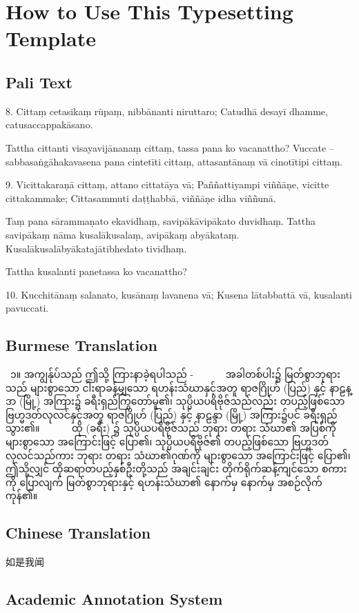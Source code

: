 \chapter{How to Use This Typesetting Template}

\starthere

\section{Pali Text}
8.
Cittaṃ cetasikaṃ rūpaṃ, nibbānanti niruttaro;
Catudhā desayī dhamme, catusaccappakāsano.

Tattha cittanti visayavijānanaṃ cittaṃ, tassa pana ko vacanattho? Vuccate – sabbasaṅgāhakavasena pana cintetīti cittaṃ, attasantānaṃ vā cinotītipi cittaṃ.

9.
Vicittakaraṇā cittaṃ, attano cittatāya vā;
Paññattiyampi viññāṇe, vicitte cittakammake;
Cittasammuti daṭṭhabbā, viññāṇe idha viññunā.

Taṃ pana sārammaṇato ekavidhaṃ, savipākāvipākato duvidhaṃ. Tattha savipākaṃ nāma kusalākusalaṃ, avipākaṃ abyākataṃ. Kusalākusalābyākatajātibhedato tividhaṃ.

Tattha kusalanti panetassa ko vacanattho?

10.
Kucchitānaṃ salanato, kusānaṃ lavanena vā;
Kusena lātabbattā vā, kusalanti pavuccati.

\section{Burmese Translation}
 ၁။ အကျွန်ုပ်သည် ဤသို့ ကြားနာခဲ့ရပါသည် -
       အခါတစ်ပါး၌ မြတ်စွာဘုရားသည် များစွာသော ငါးရာခန့်မျှသော ရဟန်းသံဃာနှင့်အတူ ရာဇဂြိုဟ် (ပြည်) နှင့် နာဠန္ဒာ (မြို့) အကြား၌ ခရီးရှည်ကြွတော်မူ၏၊ သုပ္ပိယပရိဗိုဇ်သည်လည်း တပည့်ဖြစ်သော ဗြဟ္မဒတ်လုလင်နှင့်အတူ ရာဇဂြိုဟ် (ပြည်) နှင့် နာဠန္ဒာ (မြို့) အကြား၌ပင် ခရီးရှည်သွား၏။
       ထို (ခရီး) ၌ သုပ္ပိယပရိဗိုဇ်သည် ဘုရား တရား သံဃာ၏ အပြစ်ကို များစွာသော အကြောင်းဖြင့် ပြော၏၊ သုပ္ပိယပရိဗိုဇ်၏ တပည့်ဖြစ်သော ဗြဟ္မဒတ်လုလင်သည်ကား ဘုရား တရား သံဃာ၏ဂုဏ်ကို များစွာသော အကြောင်းဖြင့် ပြော၏၊ ဤသို့လျှင် ထိုဆရာတပည့်နှစ်ဦးတို့သည် အချင်းချင်း တိုက်ရိုက်ဆန့်ကျင်သော စကားကို ပြောလျက် မြတ်စွာဘုရားနှင့် ရဟန်းသံဃာ၏ နောက်မှ နောက်မှ အစဉ်လိုက်ကုန်၏။

\section{Chinese Translation}
如是我闻

\section{Academic Annotation System}


